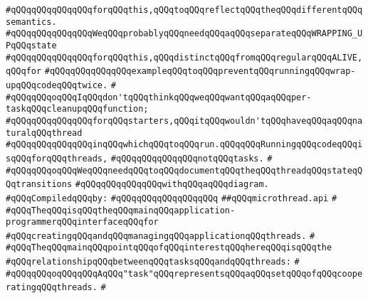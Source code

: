 \verb|#qQQqqQQqqQQqqQQqforqQQqthis,qQQqtoqQQqreflectqQQqtheqQQqdifferentqQQqsemantics.|\newline
\verb|#qQQqqQQqqQQqqQQqWeqQQqprobablyqQQqneedqQQqaqQQqseparateqQQqWRAPPING_UPqQQqstate|\newline
\verb|#qQQqqQQqqQQqqQQqforqQQqthis,qQQqdistinctqQQqfromqQQqregularqQQqALIVE,qQQqfor|\newline
\verb|#qQQqqQQqqQQqqQQqexampleqQQqtoqQQqpreventqQQqrunningqQQqwrap-upqQQqcodeqQQqtwice.|\newline
\verb|#|\newline
\verb|#qQQqqQQqoqQQqIqQQqdon'tqQQqthinkqQQqweqQQqwantqQQqaqQQqper-taskqQQqcleanupqQQqfunction;|\newline
\verb|#qQQqqQQqqQQqqQQqforqQQqstarters,qQQqitqQQqwouldn'tqQQqhaveqQQqaqQQqnaturalqQQqthread|\newline
\verb|#qQQqqQQqqQQqqQQqinqQQqwhichqQQqtoqQQqrun.qQQqqQQqRunningqQQqcodeqQQqisqQQqforqQQqthreads,|\newline
\verb|#qQQqqQQqqQQqqQQqnotqQQqtasks.|\newline
\verb|#|\newline
\verb|#qQQqqQQqoqQQqWeqQQqneedqQQqtoqQQqdocumentqQQqtheqQQqthreadqQQqstateqQQqtransitions|\newline
\verb|#qQQqqQQqqQQqqQQqwithqQQqaqQQqdiagram.|\newline
\newline
\verb|#qQQqCompiledqQQqby:|\newline
\verb|#qQQqqQQqqQQqqQQqqQQq|\newline
\newline
\verb|##qQQqmicrothread.api|\newline
\verb|#|\newline
\verb|#qQQqTheqQQqisqQQqtheqQQqmainqQQqapplication-programmerqQQqinterfaceqQQqfor|\newline
\verb|#qQQqcreatingqQQqandqQQqmanagingqQQqapplicationqQQqthreads.|\newline
\verb|#|\newline
\verb|#qQQqTheqQQqmainqQQqpointqQQqofqQQqinterestqQQqhereqQQqisqQQqthe|\newline
\verb|#qQQqrelationshipqQQqbetweenqQQqtasksqQQqandqQQqthreads:|\newline
\verb|#|\newline
\verb|#qQQqqQQqoqQQqqQQqAqQQq"task"qQQqrepresentsqQQqaqQQqsetqQQqofqQQqcooperatingqQQqthreads.|\newline
\verb|#|\newline
